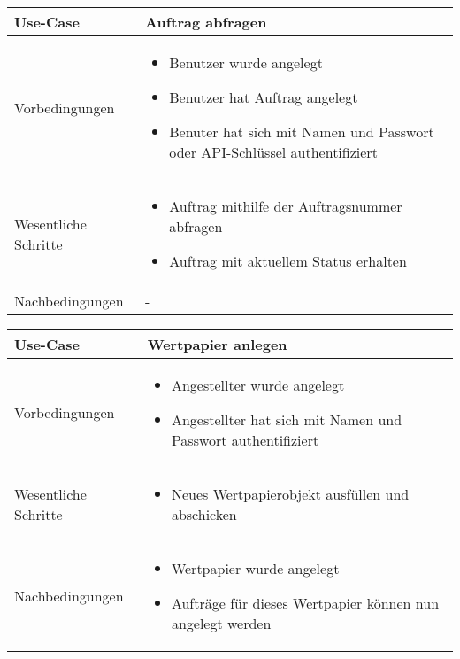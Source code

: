 \documentclass[12pt, a4paper, titlepage]{article}
\begin{document}
\begin{tabular}{|p{}|p{}|}
	\hline
	Use-Case & Auftrag abfragen \\
	\hline
	Vorbedingungen &
		\begin{itemize}
			\item Benutzer wurde angelegt
			\item Benutzer hat Auftrag angelegt
			\item Benuter hat sich mit Namen und Passwort oder API-Schlüssel
			authentifiziert
		\end{itemize} \\
	\hline
	Wesentliche Schritte &
		\begin{itemize}
			\item Auftrag mithilfe der Auftragsnummer abfragen
			\item Auftrag mit aktuellem Status erhalten
		\end{itemize} \\
	\hline
	Nachbedingungen & - \\
	\hline
\end{tabular}\par

\begin{tabular}{|p{}|p{}|}
	\hline
	Use-Case & Wertpapier anlegen \\
	\hline
	Vorbedingungen & 
		\begin{itemize}
			\item Angestellter wurde angelegt
			\item Angestellter hat sich mit Namen und Passwort authentifiziert
		\end{itemize} \\
	\hline
	Wesentliche Schritte &
		\begin{itemize}
			\item Neues Wertpapierobjekt ausfüllen und abschicken
		\end{itemize} \\
	\hline
	Nachbedingungen & 
		\begin{itemize}
			\item Wertpapier wurde angelegt
			\item Aufträge für dieses Wertpapier können nun angelegt werden
		\end{itemize} \\
	\hline
\end{tabular}\par
\end{document}
